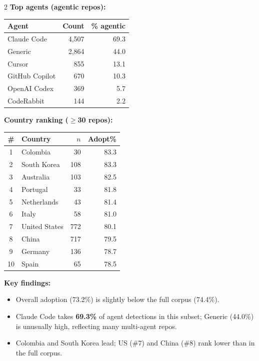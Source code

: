 \documentclass[10pt,a4paper]{article}
\begin{document}
\begin{multicols}{2}
\vspace{4pt}
\textbf{Top agents (agentic repos):}

\vspace{2pt}
\begin{tabular}{@{}lrr@{}}
\toprule
Agent & Count & \% agentic \\
\midrule
Claude Code     & 4,507 & 69.3 \\
Generic         & 2,864 & 44.0 \\
Cursor          &   855 & 13.1 \\
GitHub Copilot  &   670 & 10.3 \\
OpenAI Codex    &   369 &  5.7 \\
CodeRabbit      &   144 &  2.2 \\
\bottomrule
\end{tabular}

\vspace{4pt}
\textbf{Country ranking ($\geq$30 repos):}

\vspace{2pt}
\begin{tabular}{@{}clrr@{}}
\toprule
\# & Country & $n$ & Adopt\% \\
\midrule
 1 & Colombia      &  30 & 83.3 \\
 2 & South Korea   & 108 & 83.3 \\
 3 & Australia     & 103 & 82.5 \\
 4 & Portugal      &  33 & 81.8 \\
 5 & Netherlands   &  43 & 81.4 \\
 6 & Italy         &  58 & 81.0 \\
 7 & United States & 772 & 80.1 \\
 8 & China         & 717 & 79.5 \\
 9 & Germany       & 136 & 78.7 \\
10 & Spain         &  65 & 78.5 \\
\bottomrule
\end{tabular}

\vspace{4pt}
\textbf{Key findings:}
\begin{itemize}\setlength\itemsep{0pt}
  \item Overall adoption (73.2\%) is slightly below the full corpus (74.4\%).
  \item Claude Code takes \textbf{69.3\%} of agent detections in this
        subset; Generic (44.0\%) is unusually high, reflecting many
        multi-agent repos.
  \item Colombia and South Korea lead; US (\#7) and China (\#8) rank
        lower than in the full corpus.
\end{itemize}

\end{multicols}
\end{document}
